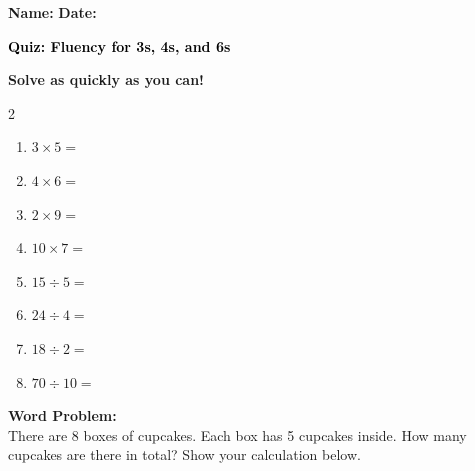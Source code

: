 \documentclass[12pt, letterpaper, fleqn]{article}
\newcommand{\blank}{\underline{\hspace{2.2cm}}}
\begin{document}
\textbf{Name:} \underline{\hspace{5cm}}
\hfill
\textbf{Date:} \underline{\hspace{3cm}}\\

\begin{tcolorbox}[colback=customteal!20]
    \large\textcolor{black}{\textbf{Quiz: Fluency for 3s, 4s, and 6s}}
\end{tcolorbox}

\vspace{5mm}
\noindent
\textbf{Solve as quickly as you can!}

\vspace{5mm}
\begin{multicols}{2}
\begin{enumerate}[itemsep=1.2cm]
\item $3 \times 5 =$ \blank
\item $4 \times 6 =$ \blank
\item $2 \times 9 =$ \blank
\item $10 \times 7 =$ \blank
\item $15 \div 5 =$ \blank
\item $24 \div 4 =$ \blank
\item $18 \div 2 =$ \blank
\item $70 \div 10 =$ \blank
\end{enumerate}
\end{multicols}

\vspace{1.5cm}
\noindent
\textbf{Word Problem:}
\\
\noindent
There are 8 boxes of cupcakes. Each box has 5 cupcakes inside. How many cupcakes are there in total? Show your calculation below.
\vspace{3cm}
\end{document}

